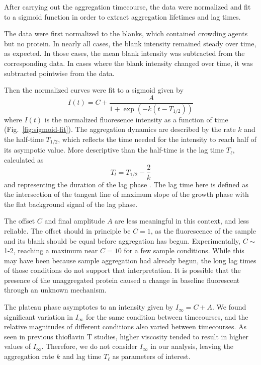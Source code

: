 After carrying out the aggregation timecourse, the data were normalized and fit to a sigmoid function in order to extract aggregation lifetimes and lag times.

The data were first normalized to the blanks, which contained crowding agents but no protein.  In nearly all cases, the blank intensity remained steady over time, as expected.  In those cases, the mean blank intensity was subtracted from the corresponding data.  In cases where the blank intensity changed over time, it was subtracted pointwise from the data.

Then the normalized curves were fit to a sigmoid given by
\begin{equation}
I(t) = C + \frac{A}{1+\exp \left(-k(t-T_{1/2})\right)}
\label{eq:sig-fit}
\end{equation}
where $I(t)$ is the normalized fluoresence intensity as a function of time (Fig.~\ref{fig:sigmoid-fit}).  The aggregation dynamics are described by the rate $k$ and the half-time $T_{1/2}$, which reflects the time needed for the intensity to reach half of its asympotic value.  More descriptive than the half-time is the lag time $T_\ell$, calculated as
\begin{equation}
T_l = T_{1/2} - \frac{2}{k}
\end{equation}
and representing the duration of the lag phase \cite{arosio15}.  The lag time here is defined as the intersection of the tangent line of maximum slope of the growth phase with the flat background signal of the lag phase.  

The offset $C$ and final amplitude $A$ are less meaningful in this context, and less reliable.  The offset should in principle be $C=1$, as the fluorescence of the sample and its blank should be equal before aggregation has begun.   Experimentally, $C \sim$ 1-2, reaching a maximum near $C= 10$ for a few sample conditions.  While this may have been because sample aggregation had already begun, the long lag times of those conditions do not support that interpretation.  It is possible that the presence of the unaggregated protein caused a change in baseline fluorescent through an unknown mechanism.

The plateau phase asymptotes to an intensity given by $I_\infty=C+A$.  We found significant variation in $I_\infty$ for the same condition between timecourses, and the relative magnitudes of different conditions also varied between timecourses.  As seen in previous thioflavin T studies, higher viscosity tended to result in higher values of $I_\infty$. Therefore, we do not consider $I_\infty$ in our analysis, leaving the aggregation rate $k$ and lag time $T_\ell$ as parameters of interest.

